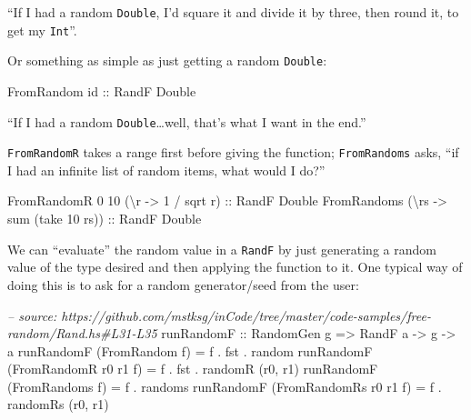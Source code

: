 \documentclass[]{article}
\newenvironment{Shaded}{}{}
\newcommand{\DataTypeTok}[1]{\textcolor[rgb]{0.56,0.13,0.00}{#1}}
\newcommand{\DecValTok}[1]{\textcolor[rgb]{0.25,0.63,0.44}{#1}}
\newcommand{\CommentTok}[1]{\textcolor[rgb]{0.38,0.63,0.69}{\textit{#1}}}
\newcommand{\OtherTok}[1]{\textcolor[rgb]{0.00,0.44,0.13}{#1}}
\newcommand{\FunctionTok}[1]{\textcolor[rgb]{0.02,0.16,0.49}{#1}}
\newcommand{\NormalTok}[1]{#1}
\begin{document}
``If I had a random \texttt{Double}, I'd square it and divide it by three, then
round it, to get my \texttt{Int}''.

Or something as simple as just getting a random \texttt{Double}:

\begin{Shaded}
\begin{Highlighting}[]
\DataTypeTok{FromRandom}\OtherTok{ id ::} \DataTypeTok{RandF} \DataTypeTok{Double}
\end{Highlighting}
\end{Shaded}

``If I had a random \texttt{Double}\ldots{}well, that's what I want in the
end.''

\texttt{FromRandomR} takes a range first before giving the function;
\texttt{FromRandoms} asks, ``if I had an infinite list of random items, what
would I do?''

\begin{Shaded}
\begin{Highlighting}[]
\DataTypeTok{FromRandomR} \DecValTok{0} \DecValTok{10}\NormalTok{ (\textbackslash{}r }\OtherTok{->} \DecValTok{1} \FunctionTok{/}\NormalTok{ sqrt r)}\OtherTok{ ::} \DataTypeTok{RandF} \DataTypeTok{Double}
\DataTypeTok{FromRandoms}\NormalTok{ (\textbackslash{}rs }\OtherTok{->}\NormalTok{ sum (take }\DecValTok{10}\NormalTok{ rs))}\OtherTok{ ::} \DataTypeTok{RandF} \DataTypeTok{Double}
\end{Highlighting}
\end{Shaded}

We can ``evaluate'' the random value in a \texttt{RandF} by just generating a
random value of the type desired and then applying the function to it. One
typical way of doing this is to ask for a random generator/seed from the user:

\begin{Shaded}
\begin{Highlighting}[]
\CommentTok{-- source: https://github.com/mstksg/inCode/tree/master/code-samples/free-random/Rand.hs#L31-L35}
\OtherTok{runRandomF ::} \DataTypeTok{RandomGen}\NormalTok{ g }\OtherTok{=>} \DataTypeTok{RandF}\NormalTok{ a }\OtherTok{->}\NormalTok{ g }\OtherTok{->}\NormalTok{ a}
\NormalTok{runRandomF (}\DataTypeTok{FromRandom}\NormalTok{ f)         }\FunctionTok{=}\NormalTok{ f }\FunctionTok{.}\NormalTok{ fst }\FunctionTok{.}\NormalTok{ random}
\NormalTok{runRandomF (}\DataTypeTok{FromRandomR}\NormalTok{ r0 r1 f)  }\FunctionTok{=}\NormalTok{ f }\FunctionTok{.}\NormalTok{ fst }\FunctionTok{.}\NormalTok{ randomR (r0, r1)}
\NormalTok{runRandomF (}\DataTypeTok{FromRandoms}\NormalTok{ f)        }\FunctionTok{=}\NormalTok{ f }\FunctionTok{.}\NormalTok{ randoms}
\NormalTok{runRandomF (}\DataTypeTok{FromRandomRs}\NormalTok{ r0 r1 f) }\FunctionTok{=}\NormalTok{ f }\FunctionTok{.}\NormalTok{ randomRs (r0, r1)}
\end{Highlighting}
\end{Shaded}
\end{document}
